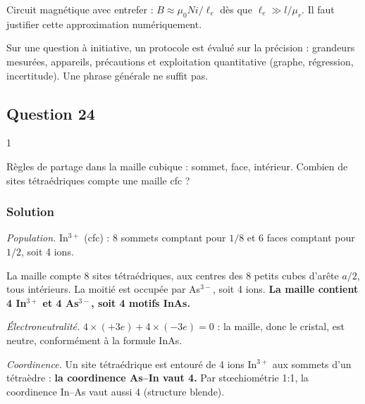\documentclass[11pt,a4paper]{article}
\begin{document}
\begin{methode}

Circuit magnétique avec entrefer : \(B\approx\mu_0Ni/\ell_e\) dès que \(\ell_e\gg l/\mu_r\). Il faut justifier cette approximation numériquement.

\end{methode}

\begin{jury}

Sur une question à initiative, un protocole est évalué sur la précision : grandeurs mesurées, appareils, précautions et exploitation quantitative (graphe, régression, incertitude). Une phrase générale ne suffit pas.

\end{jury}

\hypertarget{question-24}{%
\subsection{Question 24}\label{question-24}}

\begin{indication}{1}

Règles de partage dans la maille cubique : sommet, face, intérieur. Combien de sites tétraédriques compte une maille cfc ?

\end{indication}

\hypertarget{solution-23}{%
\subsubsection{Solution}\label{solution-23}}

\emph{Population.} In\(^{3+}\) (cfc) : 8 sommets comptant pour \(1/8\) et 6 faces comptant pour \(1/2\), soit 4 ions.

La maille compte 8 sites tétraédriques, aux centres des 8 petits cubes d'arête \(a/2\), tous intérieurs. La moitié est occupée par As\(^{3-}\), soit 4 ions. \textbf{La maille contient 4 In\(^{3+}\) et 4 As\(^{3-}\), soit 4 motifs InAs.}

\emph{Électroneutralité.} \(4\times(+3e)+4\times(-3e)=0\) : la maille, donc le cristal, est neutre, conformément à la formule InAs.

\emph{Coordinence.} Un site tétraédrique est entouré de 4 ions In\(^{3+}\) aux sommets d'un tétraèdre : \textbf{la coordinence As--In vaut 4.} Par stœchiométrie 1:1, la coordinence In--As vaut aussi 4 (structure blende).
\end{document}
